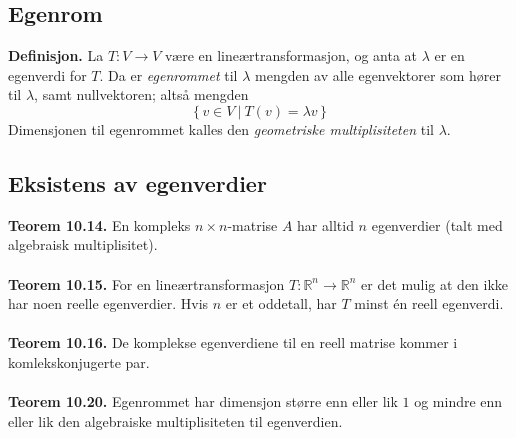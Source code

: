 \documentclass{article}
\begin{document}
\subsection{Egenrom}
\textbf{Definisjon.} La $T: V \rightarrow V$ være en lineærtransformasjon, og anta at $\lambda$ er en egenverdi for $T$. Da er \textit{egenrommet} til $\lambda$ mengden av alle egenvektorer som hører til $\lambda$, samt nullvektoren; altså mengden
\[ \{\, v \in V \ | \ T(v) = \lambda v \, \} \]
Dimensjonen til egenrommet kalles den \textit{geometriske multiplisiteten} til $\lambda$.


\subsection{Eksistens av egenverdier}
\textbf{Teorem 10.14.} En kompleks $n \times n$-matrise $A$ har alltid $n$ egenverdier (talt med algebraisk multiplisitet).
\\\\
\textbf{Teorem 10.15.} For en lineærtransformasjon $T: \mathbb{R}^n \rightarrow \mathbb{R}^n$ er det mulig at den ikke har noen reelle egenverdier. Hvis $n$ er et oddetall, har $T$ minst én reell egenverdi.
\\\\
\textbf{Teorem 10.16.} De komplekse egenverdiene til en reell matrise kommer i komlekskonjugerte par.
\\\\
\textbf{Teorem 10.20.} Egenrommet har dimensjon større enn eller lik $1$ og mindre enn eller lik den algebraiske multiplisiteten til egenverdien.




\clearpage
\end{document}

